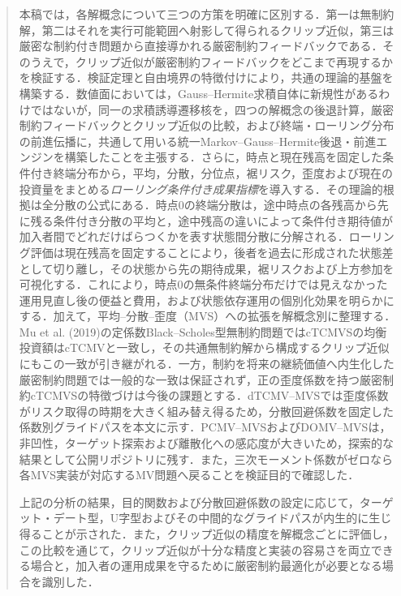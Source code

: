 \documentclass[10pt,a4paper]{article}
\theoremstyle{plain}
\theoremstyle{definition}
\begin{document}
\begin{abstract}
\begin{sloppypar}
本稿では，各解概念について三つの方策を明確に区別する．第一は無制約解，第二はそれを実行可能範囲へ射影して得られるクリップ近似，第三は厳密な制約付き問題から直接導かれる厳密制約フィードバックである．そのうえで，クリップ近似が厳密制約フィードバックをどこまで再現するかを検証する．検証定理と自由境界の特徴付けにより，共通の理論的基盤を構築する．数値面においては，Gauss--Hermite求積自体に新規性があるわけではないが，同一の求積誘導遷移核を，四つの解概念の後退計算，厳密制約フィードバックとクリップ近似の比較，および終端・ローリング分布の前進伝播に，共通して用いる統一Markov--Gauss--Hermite後退・前進エンジンを構築したことを主張する．さらに，時点と現在残高を固定した条件付き終端分布から，平均，分散，分位点，裾リスク，歪度および現在の投資量をまとめる\emph{ローリング条件付き成果指標}を導入する．その理論的根拠は全分散の公式にある．時点0の終端分散は，途中時点の各残高から先に残る条件付き分散の平均と，途中残高の違いによって条件付き期待値が加入者間でどれだけばらつくかを表す状態間分散に分解される．ローリング評価は現在残高を固定することにより，後者を過去に形成された状態差として切り離し，その状態から先の期待成果，裾リスクおよび上方参加を可視化する．これにより，時点0の無条件終端分布だけでは見えなかった運用見直し後の便益と費用，および状態依存運用の個別化効果を明らかにする．加えて，平均--分散--歪度（MVS）への拡張を解概念別に整理する．Mu et al. (2019)の定係数Black--Scholes型無制約問題ではcTCMVSの均衡投資額はcTCMVと一致し，その共通無制約解から構成するクリップ近似にもこの一致が引き継がれる．一方，制約を将来の継続価値へ内生化した厳密制約問題では一般的な一致は保証されず，正の歪度係数を持つ厳密制約cTCMVSの特徴づけは今後の課題とする．dTCMV--MVSでは歪度係数がリスク取得の時期を大きく組み替え得るため，分散回避係数を固定した係数別グライドパスを本文に示す．PCMV--MVSおよびDOMV--MVSは，非凹性，ターゲット探索および離散化への感応度が大きいため，探索的な結果として公開リポジトリに残す．また，三次モーメント係数がゼロなら各MVS実装が対応するMV問題へ戻ることを検証目的で確認した．

上記の分析の結果，目的関数および分散回避係数の設定に応じて，ターゲット・デート型，U字型およびその中間的なグライドパスが内生的に生じ得ることが示された．また，クリップ近似の精度を解概念ごとに評価し，この比較を通じて，クリップ近似が十分な精度と実装の容易さを両立できる場合と，加入者の運用成果を守るために厳密制約最適化が必要となる場合を識別した．


\end{sloppypar}
\end{abstract}
\end{document}
